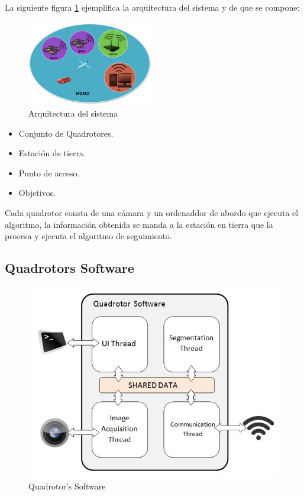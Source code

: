La siguiente figura \ref{fig:System_Architecture} ejemplifica la arquitectura del sistema y de que se compone: \\
\begin{figure}[hp]
	\centering
	\includegraphics[width=0.50\textwidth,natwidth=220,natheight=1467]{../Images/c2/Architecture.png}
	\caption{Arquitectura del sistema}
	\label{fig:System_Architecture}
\end{figure}


\begin{itemize}
  \item Conjunto de Quadrotores.
  \item Estaci\'on de tierra.
  \item Punto de acceso.
  \item Objetivos.
\end{itemize}

Cada quadrotor consta de una c\'amara y un ordenaddor de abordo que ejecuta el algoritmo, la informaci\'on obtenida se manda a la estaci\'on en tierra que la procesa y ejecuta el algoritmo de seguimiento.

\newpage
\subsection{Quadrotors Software}

	\begin{figure}[hp]
		\begin{center}
			\includegraphics[width=0.7\linewidth]{../Images/c2/Quadsoftware}
		\end{center}
		\caption{Quadrotor's Software}
		\label{fig:Quadsoftware}
	\end{figure}

